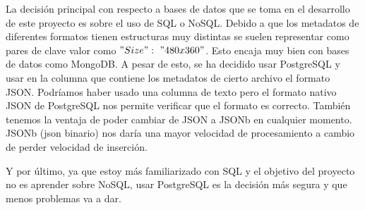 La decisión principal con respecto a bases de datos que se toma en el desarrollo de este proyecto es sobre el uso de SQL o NoSQL. Debido a que los metadatos de diferentes formatos tienen estructuras muy distintas se suelen representar como pares de clave valor como $"Size":\ "480x360"$. Esto encaja muy bien con bases de datos como MongoDB. A pesar de esto, se ha decidido usar PostgreSQL y usar en la columna que contiene los metadatos de cierto archivo el formato JSON. Podríamos haber usado una columna de texto pero el formato nativo JSON de PostgreSQL nos permite verificar que el formato es correcto. También tenemos la ventaja de poder cambiar de JSON a JSONb en cualquier momento. JSONb (json binario) nos daría una mayor velocidad de procesamiento a cambio de perder velocidad de inserción.

Y por último, ya que estoy más familiarizado con SQL y el objetivo del proyecto no es aprender sobre NoSQL, usar PostgreSQL es la decisión más segura y que menos problemas va a dar.